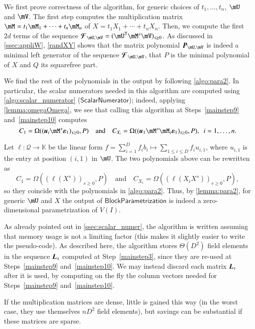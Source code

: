 \documentclass[final,1p,times,authoryear]{elsarticle}
\newcommand{\mat}[1]{\bm{\MakeUppercase{#1}}} %
\newcommand{\row}[1]{\bm{\MakeLowercase{#1}}} %
\newcommand{\col}[1]{\bm{\MakeLowercase{#1}}} %
\newcommand{\seq}{\mat{\mathcal{F}}} %
\newcommand{\minpoly}{P}
\newcommand{\mainalgoname}{\mathsf{ BlockParametrization}}
\newcommand{\lf}{X}
\newcommand{\residueI}{\mathscr{Q}}
\newcommand{\sqfree}{Q}
\newcommand{\trsp}[1]{#1^{\mathsf{T}}} %
\def\K{\mathbb{K}}
\def\K {\ensuremath{\mathbb{K}}}
\newcommand{\mUt}{\trsp{\mU}}
\begin{document}
We first prove correctness of the algorithm, for generic choices of
$t_1,\dots,t_n$, $\mU$ and $\mV$. The first step computes the
multiplication matrix $\mM=t_1 \mM_1 + \cdots + t_n \mM_n$ of $\lf=t_1
X_1 + \cdots + t_n X_n$.
Then, we compute the first $2d$ terms of the sequence $\seq_{\mU,\mV}=
(\mUt\mM^s\mV)_{s\ge 0}$. As discussed in \cref{ssec:appliW}, \cref{randXY} shows that
the matrix polynomial $\mat{P}_{\mU,\mV}$ is indeed a minimal left
generator of the sequence $\seq_{\mU,\mV}$, that $\minpoly$ is the minimal 
polynomial of $\lf$ and $\sqfree$ its squarefree part.

We find the rest of the polynomials in the output by following
\cref{algo:para2}. In particular, the scalar numerators
needed in this algorithm are computed using \cref{algo:scalar_numerator}
($\mathsf{ScalarNumerator}$); indeed, applying \cref{lemma:omegaOmega},
we see that calling this algorithm
at Steps~\ref{mainstep9} and~\ref{mainstep10}
computes $$C_1 = \Omega((\row{u}_i \mM^s \col{\varepsilon}_1)_{s \ge
0}, \minpoly) \quad\text{and}\quad C_{X_i} = \Omega((\row{u}_1 \mM^s
\mM_i \col{\varepsilon}_1)_{s \ge 0}, \minpoly),\ \ i=1,\dots,n.$$ 

Let $\ell:\residueI \to \K$ be the linear form $f = \sum_{i=1}^D f_i b_i
\mapsto \sum_{1 \le i \le D} f_i u_{i,1}$, where $u_{i,1}$ is the entry at
position $(i,1)$ in $\mU$. The two polynomials above can be rewritten as 
\[
  C_1 = \Omega( (\ell(X^s))_{s \ge 0}, \minpoly) \quad\text{and}\quad
C_{X_i} = \Omega( (\ell(X_i X^s))_{s \ge 0}, \minpoly),
\]
so they coincide with the polynomials in \cref{algo:para2}.  Thus, by
\cref{lemma:para2}, for generic $\mU$ and $\lf$ the output of $\mainalgoname$
is indeed a zero-dimensional parametrization of $V(I)$.  

\begin{remark}
  As already pointed out in \cref{ssec:scalar_numer}, the algorithm is
  written assuming that memory usage is not a limiting factor (this
  makes it slightly easier to write the pseudo-code). As described
  here, the algorithm stores $\Theta(D^2)$ field elements in the
  sequence $\mat{L}_s$ computed at Step~\ref{mainstep3}, since they
  are re-used at Steps~\ref{mainstep9} and~\ref{mainstep10}.  We may
  instead discard each matrix $\mat{L}_s$ after it is used, by
  computing on the fly the column vectors needed for Steps~\ref{mainstep9}
  and~\ref{mainstep10}.

  If the multiplication matrices are dense, little is gained this way (in
  the worst case, they use themselves $n D^2$ field elements), but savings can
  be substantial if these  matrices are sparse.
\end{remark}
\end{document}
